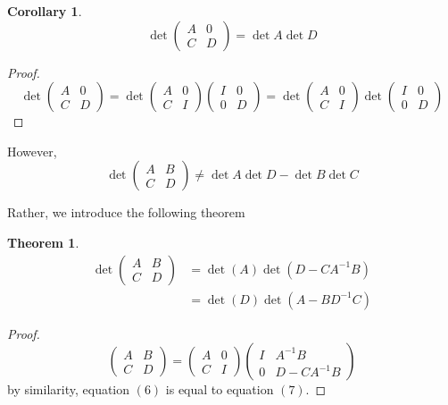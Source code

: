 \documentclass{article}
\newtheorem{theorem}{Theorem}[section]
\newtheorem{corollary}{Corollary}[theorem]
\theoremstyle{remark}
\theoremstyle{definition}
\begin{document}
\begin{corollary}
\[\det{\begin{pmatrix}
A&0\\C&D
\end{pmatrix}} = \det{A} \det{D}\]
\end{corollary}

\begin{proof}
\[ \det{\begin{pmatrix}
A&0\\C&D 
\end{pmatrix}} = \det{\begin{pmatrix}
A&0\\C&I
\end{pmatrix} \begin{pmatrix}
I&0\\0&D
\end{pmatrix}} = \det{\begin{pmatrix}
A&0\\C&I
\end{pmatrix}} \det{\begin{pmatrix}
I&0\\0&D
\end{pmatrix}}\]
\end{proof}

However, 
\[\det{\begin{pmatrix}
A&B\\C&D
\end{pmatrix}} \neq \det{A} \det{D} - \det{B} \det{C}\]

Rather, we introduce the following theorem

\begin{theorem}
\begin{align}
    \det{\begin{pmatrix} A&B\\C&D \end{pmatrix}}  & = \det{(A)} \det{(D - C A^{-1} B)} \\
    & = \det{(D)} \det{(A - B D^{-1} C)}
\end{align}
\end{theorem}
\begin{proof}
\[\begin{pmatrix} A&B\\C&D\end{pmatrix} = \begin{pmatrix}
A&0\\C&I\end{pmatrix} \begin{pmatrix}
I& A^{-1} B \\ 0 & D - C A^{-1} B
\end{pmatrix}\]
by similarity, equation $(6)$ is equal to equation $(7)$. 
\end{proof}
\end{document}
